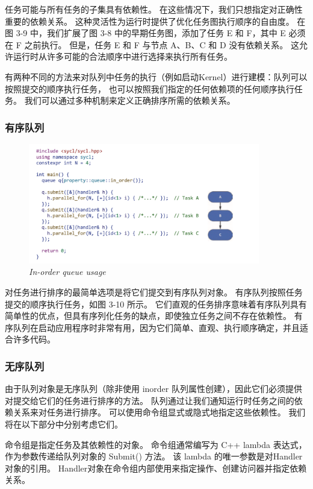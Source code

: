 任务可能与所有任务的子集具有依赖性。 在这些情况下，我们只想指定对正确性重要的依赖关系。 
这种灵活性为运行时提供了优化任务图执行顺序的自由度。 
在图 3-9 中，我们扩展了图 3-8 中的早期任务图，添加了任务 E 和 F，其中 E 必须在 F 之前执行。
但是，任务 E 和 F 与节点 A、B、C 和 D 没有依赖关系。 这允许运行时从许多可能的合法顺序中进行选择来执行所有任务。

有两种不同的方法来对队列中任务的执行（例如启动Kernel）进行建模：队列可以按照提交的顺序执行任务，
也可以按照我们指定的任何依赖项的任何顺序执行任务。 我们可以通过多种机制来定义正确排序所需的依赖关系。

\subsubsection{有序队列}
\begin{figure}[H]
	\centering
	\includegraphics[width=0.9\textwidth]{figs/F3.10.png}
	\caption{\textit{In-order queue usage}}
\end{figure}

对任务进行排序的最简单选项是将它们提交到有序队列对象。 有序队列按照任务提交的顺序执行任务，如图 3-10 所示。 
它们直观的任务排序意味着有序队列具有简单性的优点，但具有序列化任务的缺点，即使独立任务之间不存在依赖性。 
有序队列在启动应用程序时非常有用，因为它们简单、直观、执行顺序确定，并且适合许多代码。

\subsubsection{无序队列}
由于队列对象是无序队列（除非使用 inorder 队列属性创建），因此它们必须提供对提交给它们的任务进行排序的方法。 
队列通过让我们通知运行时任务之间的依赖关系来对任务进行排序。 可以使用命令组显式或隐式地指定这些依赖性。 
我们将在以下部分中分别考虑它们。

命令组是指定任务及其依赖性的对象。 命令组通常编写为 C++ lambda 表达式，作为参数传递给队列对象的 Submit() 方法。 
该 lambda 的唯一参数是对Handler对象的引用。 Handler对象在命令组内部使用来指定操作、创建访问器并指定依赖关系。

